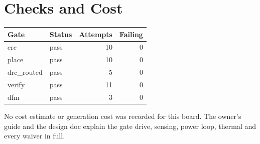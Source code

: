 \documentclass[11pt,a4paper]{article}
\begin{document}
\section{Checks and Cost}
{\small
\begin{longtable}{llrr}
\toprule
\textbf{Gate} & \textbf{Status} & \textbf{Attempts} & \textbf{Failing} \\
\midrule
\endhead
erc & pass & 10 & 0 \\
place & pass & 10 & 0 \\
drc\_routed & pass & 5 & 0 \\
verify & pass & 11 & 0 \\
dfm & pass & 3 & 0 \\
\bottomrule
\end{longtable}
}
No cost estimate or generation cost was recorded for this board. The owner's guide and the design doc explain the gate drive, sensing, power loop, thermal and every waiver in full.
\end{document}
